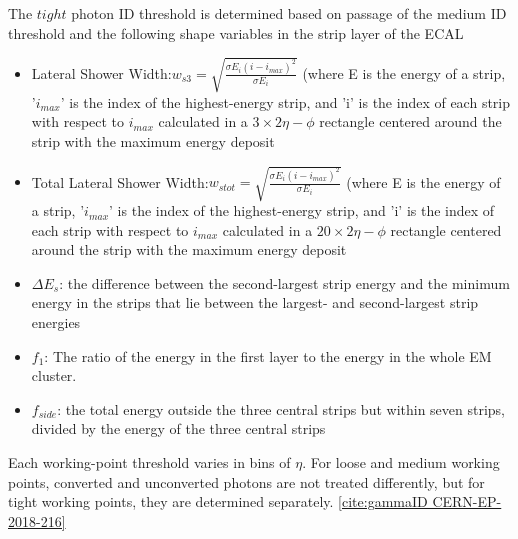 The $tight$ photon ID threshold is determined based on passage of the medium ID threshold and the following shape variables in the strip layer of the ECAL
\begin{itemize}
  \item Lateral Shower Width:$w_{s3} = \sqrt{\frac{\sigma E_{i}(i-i_{max})^{2}}{\sigma E_{i}}}$ (where E is the energy of a strip, '$i_{max}$' is the index of the highest-energy strip, and 'i' is the index of each strip with respect to $i_{max}$ calculated in a $3 \times 2 \eta-\phi$  rectangle centered around the strip with the maximum energy deposit
  \item Total Lateral Shower Width:$w_{s tot} = \sqrt{\frac{\sigma E_{i}(i-i_{max})^{2}}{\sigma E_{i}}}$ (where E is the energy of a strip, '$i_{max}$' is the index of the highest-energy strip, and 'i' is the index of each strip with respect to $i_{max}$ calculated in a $20 \times 2 \eta-\phi$  rectangle centered around the strip with the maximum energy deposit
  \item $\Delta E_{s}$: the difference between the second-largest strip energy and the minimum energy in the strips that lie between the largest- and second-largest strip energies
  \item $f_{1}$: The ratio of the energy in the first layer to the energy in the whole EM cluster.
  \item $f_{side}$: the total energy outside the three central strips but within seven strips, divided by the energy of the three central strips 
\end{itemize}

Each working-point threshold varies in bins of $\eta$. For loose and medium working points, converted and unconverted photons are not treated differently, but for tight working points, they are determined separately. \ref{cite:gammaID CERN-EP-2018-216}

